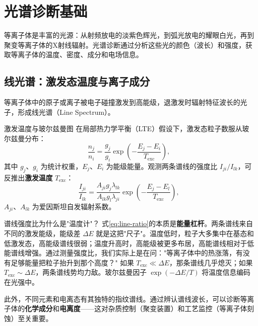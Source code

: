 \documentclass[12pt,a4paper,openany,oneside]{book}
\begin{document}
\section{光谱诊断基础}
\label{sec:12.5}

等离子体是丰富的光源：从射频放电的淡紫色辉光，到弧光放电的耀眼白光，再到聚变等离子体的X射线辐射。光谱诊断通过分析这些光的颜色（波长）和强度，获取等离子体的温度、密度、成分和电场信息。

\subsection{线光谱：激发态温度与离子成分}

等离子体中的原子或离子被电子碰撞激发到高能级，退激发时辐射特征波长的光子，形成线光谱（Line Spectrum）。

\begin{definition}{激发温度与玻尔兹曼图}{}{}
在局部热力学平衡（LTE）假设下，激发态粒子数服从玻尔兹曼分布：
\begin{equation}
\frac{n_j}{n_i} = \frac{g_j}{g_i}\exp\!\left(-\frac{E_j - E_i}{T_{\mathrm{exc}}}\right),
\label{eq:boltzmann-excitation}
\end{equation}
其中 $g_j$、$g_i$ 为统计权重，$E_j$、$E_i$ 为能级能量。观测两条谱线的强度比 $I_{ji}/I_{lk}$，可反推出\textbf{激发温度} $T_{\mathrm{exc}}$：
\begin{equation}
\frac{I_{ji}}{I_{lk}} = \frac{A_{ji} g_j \lambda_{lk}}{A_{lk} g_l \lambda_{ji}} \exp\!\left(-\frac{E_j - E_l}{T_{\mathrm{exc}}}\right),
\label{eq:line-ratio}
\end{equation}
$A_{ji}$、$A_{lk}$ 为爱因斯坦自发辐射系数。
\end{definition}

\begin{insight}{谱线强度比为什么是"温度计"？}{}
式\eqref{eq:line-ratio}的本质是\textbf{能量杠杆}。两条谱线来自不同的激发能级，能级差 $\Delta E$ 就是这把"尺子"。温度低时，粒子大多集中在基态和低激发态，高能级谱线很弱；温度升高时，高能级被更多布居，高能谱线相对于低能谱线增强。通过测量强度比，我们实际上是在问："等离子体中的热涨落，有没有足够能量把粒子抬升到那个高度？" 如果 $T_{\mathrm{exc}} \ll \Delta E$，那条谱线几乎熄灭；如果 $T_{\mathrm{exc}} \sim \Delta E$，两条谱线势均力敌。玻尔兹曼因子 $\exp(-\Delta E/T)$ 将温度信息编码在光强中。
\end{insight}

此外，不同元素和电离态有其独特的指纹谱线。通过辨认谱线波长，可以诊断等离子体的\textbf{化学成分}和\textbf{电离度}——这对杂质控制（聚变装置）和工艺监控（等离子体刻蚀）至关重要。
\end{document}
